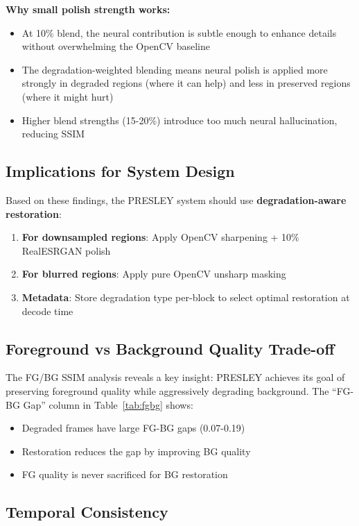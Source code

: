 \documentclass[11pt,a4paper]{article}
\begin{document}
\textbf{Why small polish strength works:}
\begin{itemize}
    \item At 10\% blend, the neural contribution is subtle enough to enhance details without overwhelming the OpenCV baseline
    \item The degradation-weighted blending means neural polish is applied more strongly in degraded regions (where it can help) and less in preserved regions (where it might hurt)
    \item Higher blend strengths (15-20\%) introduce too much neural hallucination, reducing SSIM
\end{itemize}

\subsection{Implications for System Design}

Based on these findings, the PRESLEY system should use \textbf{degradation-aware restoration}:
\begin{enumerate}
    \item \textbf{For downsampled regions}: Apply OpenCV sharpening + 10\% RealESRGAN polish
    \item \textbf{For blurred regions}: Apply pure OpenCV unsharp masking
    \item \textbf{Metadata}: Store degradation type per-block to select optimal restoration at decode time
\end{enumerate}

\subsection{Foreground vs Background Quality Trade-off}

The FG/BG SSIM analysis reveals a key insight: PRESLEY achieves its goal of preserving foreground quality while aggressively degrading background. The ``FG-BG Gap'' column in Table~\ref{tab:fgbg} shows:
\begin{itemize}
    \item Degraded frames have large FG-BG gaps (0.07-0.19)
    \item Restoration reduces the gap by improving BG quality
    \item FG quality is never sacrificed for BG restoration
\end{itemize}

\subsection{Temporal Consistency}
\end{document}
